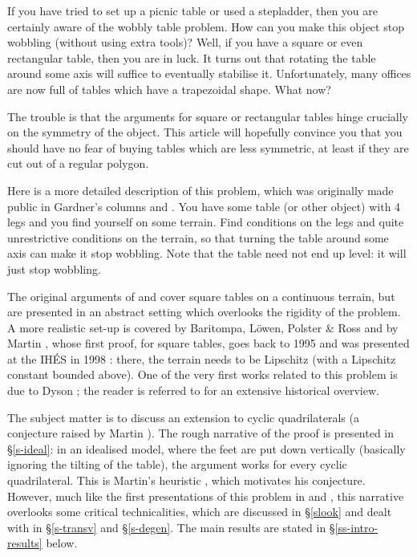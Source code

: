 \documentclass[a4paper,11pt,twoside,leqno]{article}
\numberwithin{equation}{section}
\begin{document}
If you have tried to set up a picnic table or used a stepladder, then you are certainly aware of the wobbly table problem.
How can you make this object stop wobbling (without using extra tools)?
Well, if you have a square or even rectangular table, then you are in luck. It turns out that rotating the table around some axis will suffice to eventually stabilise it. Unfortunately, many offices are now full of tables which have a trapezoidal shape. What now?

The trouble is that the arguments for square or rectangular tables hinge crucially on the symmetry of the object. This article will hopefully convince you that you should have no fear of buying tables which are less symmetric, at least if they are cut out of a regular polygon.



Here is a more detailed description of this problem, which was originally made public in Gardner's columns \cite{Ga1} and \cite{Ga2}.
You have some table (or other object) with 4 legs and you find yourself on some terrain. Find conditions on the legs and quite unrestrictive conditions on the terrain, so that turning the table around some axis can make it stop wobbling. Note that the table need not end up level: it will just stop wobbling.

The original arguments of \cite{Ga1} and \cite{Ga2} cover square tables on a continuous terrain, but are presented in an abstract setting which overlooks the rigidity of the problem.
A more realistic set-up is covered by Baritompa, L\"owen, Polster \& Ross \cite{BLPR} and by Martin \cite{Mar}, whose first proof, for square tables, goes back to 1995 and was presented at the IH\'ES in 1998 \cite[\S{}1]{Mar}: there, the terrain needs to be Lipschitz (with a Lipschitz constant bounded above). One of the very first works related to this problem is due to Dyson \cite{Dys}; the reader is referred to \cite{BLPR} for an extensive historical overview.

The subject matter is to discuss an extension to cyclic quadrilaterals (a conjecture raised by Martin \cite[\S{}4]{Mar}). The rough narrative of the proof is presented in \S{}\ref{s-ideal}: in an idealised model, where the feet are put down vertically (basically ignoring the tilting of the table), the argument works for every cyclic quadrilateral. This is Martin's heuristic \cite[\S{}4]{Mar}, which motivates his conjecture. However, much like the first presentations of this problem in \cite{Ga1} and \cite{Ga2}, this narrative overlooks some critical technicalities, which are discussed in \S{}\ref{slook} and dealt with in \S{}\ref{s-transv} and \S{}\ref{s-degen}. The main results are stated in \S{}\ref{ss-intro-results} below.
\end{document}

